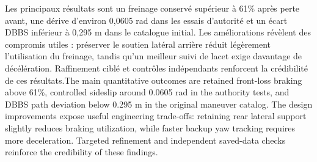 \documentclass[11pt,a4paper,oneside]{report}
\newcommand{\bi}[2]{\iffrench #2\else #1\fi}
\begin{document}
\bi{The main quantitative outcomes are retained front-loss braking above 61\%, controlled sideslip around 0.0605 rad in the authority tests, and DBBS path deviation below 0.295 m in the original maneuver catalog. The design improvements expose useful engineering trade-offs: retaining rear lateral support slightly reduces braking utilization, while faster backup yaw tracking requires more deceleration. Targeted refinement and independent saved-data checks reinforce the credibility of these findings.}{Les principaux résultats sont un freinage conservé supérieur à 61\% après perte avant, une dérive d'environ 0,0605 rad dans les essais d'autorité et un écart DBBS inférieur à 0,295 m dans le catalogue initial. Les améliorations révèlent des compromis utiles : préserver le soutien latéral arrière réduit légèrement l'utilisation du freinage, tandis qu'un meilleur suivi de lacet exige davantage de décélération. Raffinement ciblé et contrôles indépendants renforcent la crédibilité de ces résultats.}
\end{document}
